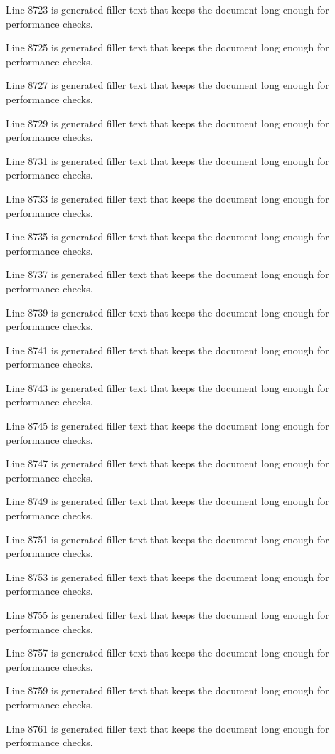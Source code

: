 Line 8723 is generated filler text that keeps the document long enough for performance checks.

Line 8725 is generated filler text that keeps the document long enough for performance checks.

Line 8727 is generated filler text that keeps the document long enough for performance checks.

Line 8729 is generated filler text that keeps the document long enough for performance checks.

Line 8731 is generated filler text that keeps the document long enough for performance checks.

Line 8733 is generated filler text that keeps the document long enough for performance checks.

Line 8735 is generated filler text that keeps the document long enough for performance checks.

Line 8737 is generated filler text that keeps the document long enough for performance checks.

Line 8739 is generated filler text that keeps the document long enough for performance checks.

Line 8741 is generated filler text that keeps the document long enough for performance checks.

Line 8743 is generated filler text that keeps the document long enough for performance checks.

Line 8745 is generated filler text that keeps the document long enough for performance checks.

Line 8747 is generated filler text that keeps the document long enough for performance checks.

Line 8749 is generated filler text that keeps the document long enough for performance checks.

Line 8751 is generated filler text that keeps the document long enough for performance checks.

Line 8753 is generated filler text that keeps the document long enough for performance checks.

Line 8755 is generated filler text that keeps the document long enough for performance checks.

Line 8757 is generated filler text that keeps the document long enough for performance checks.

Line 8759 is generated filler text that keeps the document long enough for performance checks.

Line 8761 is generated filler text that keeps the document long enough for performance checks.

